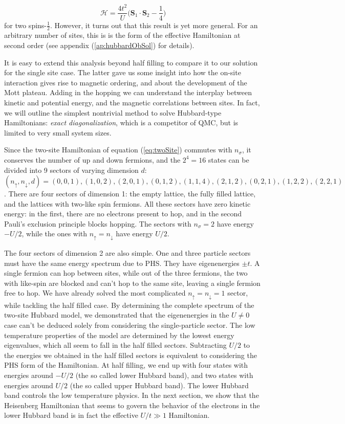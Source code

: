 \begin{equation}
\mathcal{H} = \frac{4t^2}{U} \bigg( \bm S_1 \cdot \bm S_2 - \frac{1}{4} \bigg)
\end{equation}
for two spins-$\frac{1}{2}$.
However, it turns out that this result is yet more general.
For an arbitrary number of sites, this is is the form of the effective Hamiltonian at second order (see appendix (\ref{ap:hubbardObSol}) for details).

It is easy to extend this analysis beyond half filling  to compare it to our solution for the single site case.
The latter gave us some insight into how the on-site interaction gives rise to magnetic ordering, and about the development of the Mott plateau.
Adding in the hopping we can understand the interplay between kinetic and potential energy, and the magnetic correlations between sites.
In fact, we will outline the simplest nontrivial method to solve Hubbard-type Hamiltonians: \emph{exact diagonalization}, which is a competitor of \acs{QMC}, but is limited to very small system sizes.

Since the two-site Hamiltonian of equation (\ref{eq:twoSite}) commutes with $n_\sigma$, it conserves the number of up and down fermions, and the $2^4 = 16$ states can be divided into 9 sectors of varying dimension $d$: $(n_\uparrow, n_\downarrow, d) = (0, 0, 1), (1, 0, 2), (2, 0, 1), (0, 1, 2), (1, 1, 4), (2, 1, 2), (0, 2, 1), (1, 2, 2), (2,2, 1)$.
There are four sectors of dimension 1: the empty lattice, the fully filled lattice, and the lattices with two-like spin fermions.
All these sectors have zero kinetic energy: in the first, there are no electrons present to hop, and in the second Pauli's exclusion principle blocks hopping.
The sectors with $n_\sigma = 2$ have energy $- U / 2$, while the ones with $n_\uparrow = n_\downarrow$ have energy $U / 2$.

The four sectors of dimension 2 are also simple.
One and three particle sectors must have the same energy spectrum due to \acf{PHS}.
They have eigenenergies $\pm t$.
A single fermion can hop between sites, while out of the three fermions, the two with like-spin are blocked and can't hop to the same site, leaving a single fermion free to hop.
We have already solved the most complicated $n_\uparrow = n_\downarrow = 1$ sector, while tackling the half filled case.
By determining the complete spectrum of the two-site Hubbard model, we demonstrated that the eigenenergies in the $U \neq 0$ case can't be deduced solely from considering the single-particle sector.
The low temperature properties of the model are determined by the lowest energy eigenvalues, which all seem to fall in the half filled sectors.
Subtracting $U / 2$ to the energies we obtained in the half filled sectors is equivalent to considering the \acs{PHS} form of the Hamiltonian. 
At half filling, we end up with four states with energies around $-U / 2$ (the so called lower Hubbard band), and two states with energies around $U / 2$ (the so called upper Hubbard band).
The lower Hubbard band controls the low temperature physics.
In the next section, we show that the Heisenberg Hamiltonian that seems to govern the behavior of the electrons in the lower Hubbard band is in fact the effective $U / t \gg 1$ Hamiltonian.

